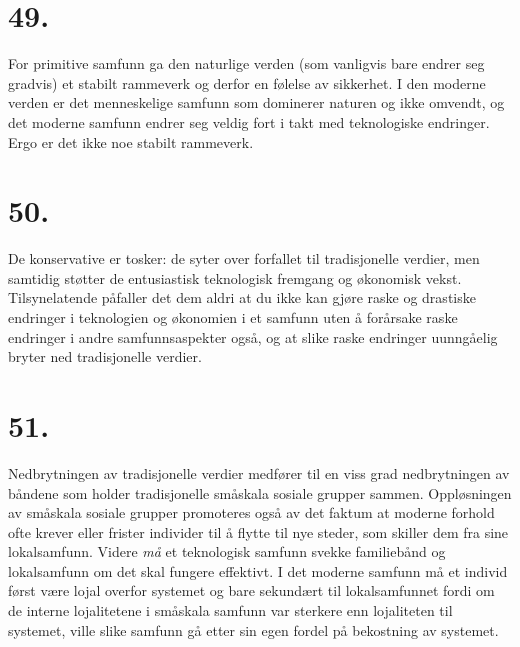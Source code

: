\documentclass[oneside]{book}
\begin{document}
\section*{49.}
For primitive samfunn ga den naturlige verden (som vanligvis bare endrer seg
gradvis) et stabilt rammeverk og derfor en følelse av sikkerhet. I den moderne
verden er det menneskelige samfunn som dominerer naturen og ikke omvendt, og
det moderne samfunn endrer seg veldig fort i takt med teknologiske endringer.
Ergo er det ikke noe stabilt rammeverk.

\section*{50.}
De konservative er tosker: de syter over forfallet til tradisjonelle verdier,
men samtidig støtter de entusiastisk teknologisk fremgang og økonomisk vekst.
Tilsynelatende påfaller det dem aldri at du ikke kan gjøre raske og drastiske
endringer i teknologien og økonomien i et samfunn uten å forårsake raske
endringer i andre samfunnsaspekter også, og at slike raske endringer uunngåelig
bryter ned tradisjonelle verdier.

\section*{51.}
Nedbrytningen av tradisjonelle verdier medfører til en viss grad nedbrytningen
av båndene som holder tradisjonelle småskala sosiale grupper sammen.
Oppløsningen av småskala sosiale grupper promoteres også av det faktum at
moderne forhold ofte krever eller frister individer til å flytte til nye
steder, som skiller dem fra sine lokalsamfunn. Videre \emph{må} et teknologisk
samfunn svekke familiebånd og lokalsamfunn om det skal fungere effektivt. I det
moderne samfunn må et individ først være lojal overfor systemet og bare
sekundært til lokalsamfunnet fordi om de interne lojalitetene i småskala
samfunn var sterkere enn lojaliteten til systemet, ville slike samfunn gå etter
sin egen fordel på bekostning av systemet. 
\end{document}
